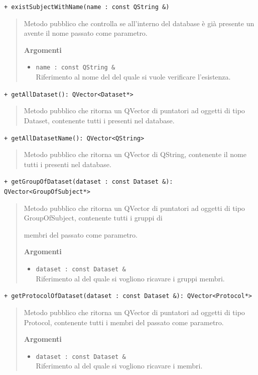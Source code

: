 \color{blue}\verb!+ existSubjectWithName(name : const QString &)!
\begin{quote}
\color{black} Metodo pubblico che controlla se all'interno del database è già presente un \dataset{} avente il nome passato come parametro. 

\textbf{Argomenti}
\begin{itemize}
\item \verb!name : const QString &! \\ Riferimento al nome del \dataset{} del quale si vuole verificare l'esistenza.
\end{itemize}
\end{quote}

\color{blue}\verb!+ getAllDataset(): QVector<Dataset*>!
\begin{quote}
\color{black} Metodo pubblico che ritorna un QVector di puntatori ad oggetti di tipo Dataset, contenente tutti i \dataset{} presenti nel database.
\end{quote}

\color{blue}\verb!+ getAllDatasetName(): QVector<QString>!
\begin{quote}
\color{black} Metodo pubblico che ritorna un QVector di QString, contenente il nome tutti i \dataset{} presenti nel database.
\end{quote}

\color{blue}\verb!+ getGroupOfDataset(dataset : const Dataset &): QVector<GroupOfSubject*>!
\begin{quote}
\color{black} Metodo pubblico che ritorna un QVector di puntatori ad oggetti di tipo GroupOfSubject, contenente tutti i gruppi di \subject{} membri del \dataset{} passato come parametro.

\textbf{Argomenti}
\begin{itemize}
\item \verb!dataset : const Dataset &! \\ Riferimento al  \dataset{} del quale si vogliono ricavare i gruppi membri.
\end{itemize}
\end{quote}

\color{blue}\verb!+ getProtocolOfDataset(dataset : const Dataset &): QVector<Protocol*>!
\begin{quote}
\color{black} Metodo pubblico che ritorna un QVector di puntatori ad oggetti di tipo Protocol, contenente tutti i \protocol{} membri del \dataset{} passato come parametro.

\textbf{Argomenti}
\begin{itemize}
\item \verb!dataset : const Dataset &! \\ Riferimento al \dataset{} del quale si vogliono ricavare i \protocol{} membri.
\end{itemize}
\end{quote}

